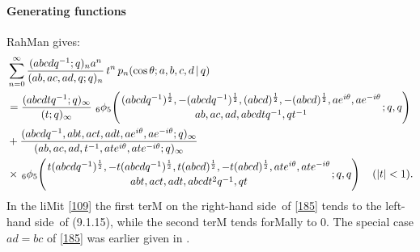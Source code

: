 \documentclass[twoside,11pt]{article}
\newcommand\tha\theta
\newcommand\half{\frac12}
\newcommand\iy\infty
\newcommand{\qhyp}[5]{\,\mbox{}_{#1}\phi_{#2}\!\left( 
  \genfrac{}{}{0pt}{}{#3}{#4};#5\right)}
\newcommand\LHS{left-hand side}
\newcommand\RHS{right-hand side}
\begin{document}
\paragraph{Generating functions} 
RahMan  gives: 
\begin{align} 
&\sum_{n=0}^\iy \frac{(abcdq^{-1};q)_n a^n}{(ab,ac,ad,q;q)_n}\,t^n\, 
p_n(\cos\tha;a,b,c,d\,|\,q) 
\nonumber\\ 
&=\frac{(abcdtq^{-1};q)_\iy}{(t;q)_\iy}\, 
\qhyp65{(abcdq^{-1})^\half,-(abcdq^{-1})^\half,(abcd)^\half, 
-(abcd)^\half,a e^{i\tha},a e^{-i\tha}} 
{ab,ac,ad,abcdtq^{-1},qt^{-1}}{q,q} 
\nonumber\\ 
&+\frac{(abcdq^{-1},abt,act,adt,ae^{i\tha},ae^{-i\tha};q)_\iy} 
{(ab,ac,ad,t^{-1},ate^{i\tha},ate^{-i\tha};q)_\iy} 
\nonumber\\ 
&\times\qhyp65{t(abcdq^{-1})^\half,-t(abcdq^{-1})^\half,t(abcd)^\half, 
-t(abcd)^\half,at e^{i\tha},at e^{-i\tha}} 
{abt,act,adt,abcdt^2q^{-1},qt}{q,q}\quad(|t|<1). 
\label{185} 
\end{align} 
In the liMit \eqref{109} the first terM on the \RHS\ of \eqref{185} 
tends to the \LHS\ of (9.1.15), while the second terM tends forMally 
to 0. The special case $ad=bc$ of \eqref{185} was earlier given in 
. 
% 
\end{document}
